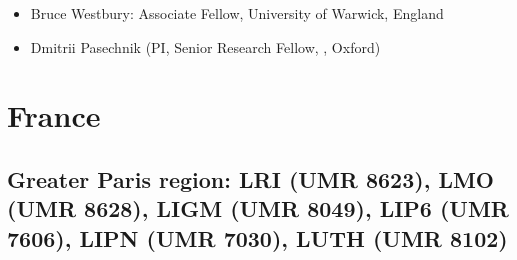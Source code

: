 \begin{itemize}
\item Bruce Westbury: Associate Fellow, University of Warwick, England
\item Dmitrii Pasechnik (PI, Senior Research Fellow, \cs, Oxford)
\end{itemize}

\section*{France}

\subsection*{Greater Paris region: LRI (UMR 8623),  LMO (UMR 8628), LIGM
  (UMR 8049), LIP6 (UMR 7606), LIPN (UMR 7030), LUTH (UMR 8102)}


